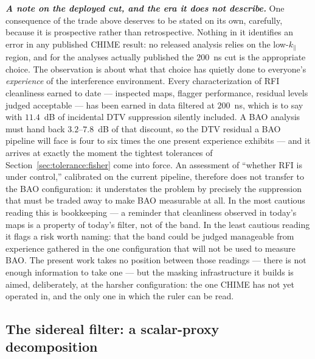 \medskip
\noindent\textbf{\textit{A note on the deployed cut, and the era it does not describe.}} One consequence of the trade above deserves to be stated on its own, carefully, because it is prospective rather than retrospective. Nothing in it identifies an error in any published CHIME result: no released analysis relies on the low-$k_\parallel$ region, and for the analyses actually published the $200$~ns cut is the appropriate choice. The observation is about what that choice has quietly done to everyone's \emph{experience} of the interference environment. Every characterization of RFI cleanliness earned to date --- inspected maps, flagger performance, residual levels judged acceptable --- has been earned in data filtered at $200$~ns, which is to say with $11.4$~dB of incidental DTV suppression silently included. A BAO analysis must hand back $3.2$--$7.8$~dB of that discount, so the DTV residual a BAO pipeline will face is four to six times the one present experience exhibits --- and it arrives at exactly the moment the tightest tolerances of Section~\ref{sec:tolerance:fisher} come into force. An assessment of ``whether RFI is under control,'' calibrated on the current pipeline, therefore does not transfer to the BAO configuration: it understates the problem by precisely the suppression that must be traded away to make BAO measurable at all. In the most cautious reading this is bookkeeping --- a reminder that cleanliness observed in today's maps is a property of today's filter, not of the band. In the least cautious reading it flags a risk worth naming: that the band could be judged manageable from experience gathered in the one configuration that will not be used to measure BAO. The present work takes no position between those readings --- there is not enough information to take one --- but the masking infrastructure it builds is aimed, deliberately, at the harsher configuration: the one CHIME has not yet operated in, and the only one in which the ruler can be read.

\subsection*{The sidereal filter: a scalar-proxy decomposition}

